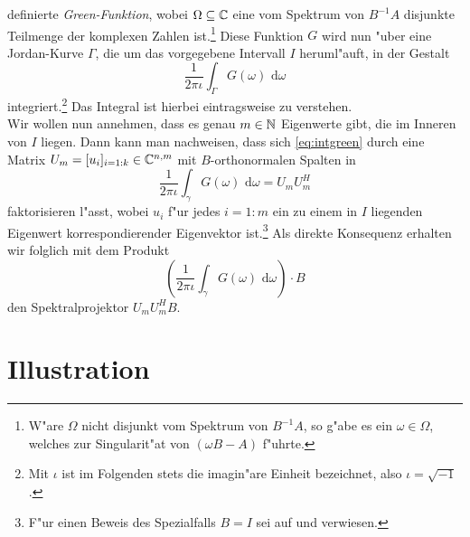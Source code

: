 definierte \emph{Green-Funktion}, wobei $\Omega \subseteq \mathbb{C}$ eine vom Spektrum
von $B^{-1}A$ disjunkte Teilmenge der komplexen Zahlen ist.\footnote{W"are $\Omega$ nicht disjunkt vom Spektrum von $B^{-1}A$, so g"abe es ein $\omega\in\Omega$, welches zur Singularit"at von $(\omega B-A)$ f"uhrte.}
Diese Funktion $G$ wird nun "uber eine Jordan-Kurve $\Gamma$,
die um das vorgegebene Intervall $I$ \glqq heruml"auft\grqq, %
in der Gestalt
\begin{equation}\label{eq:intgreen}
\frac{1}{2\pi\iota}\int_\Gamma G(\omega)\text{ d}\omega
\end{equation}
integriert.\footnote{Mit $\iota$ ist im Folgenden stets die imagin"are Einheit bezeichnet,
also $\iota = \sqrt{-1}$.} Das Integral ist hierbei eintragsweise zu verstehen.\\

Wir wollen nun annehmen, dass es genau $m\in\mathbb{N}$ Eigenwerte gibt,
die im Inneren von $I$ liegen. %
Dann kann man nachweisen, dass sich \eqref{eq:intgreen} durch eine Matrix
$U_m = [u_i]_{i=1:k}\in\mathbb{C}^{n,m}$ mit $B$-orthonormalen Spalten in
\[
\frac{1}{2\pi\iota}\int_\gamma G(\omega)\text{ d}\omega = U_m U_m^H
\]
faktorisieren l"asst, wobei $u_i$ f"ur jedes $i=1:m$ ein zu einem in $I$ liegenden
Eigenwert korrespondierender Eigenvektor ist.\footnote{F"ur einen Beweis des Spezialfalls $B=I$ sei auf \cite[64f]{gohberg} und \cite[222-226]{liesen} verwiesen.}
Als direkte Konsequenz erhalten wir folglich mit dem Produkt
\[
\left( \frac{1}{2\pi\iota}\int_\gamma G(\omega)\text{ d}\omega \right) \cdot B
\]
den Spektralprojektor $U_m U_m^H B$. %

\newpage
\section{Illustration}\label{sec:bsp}

